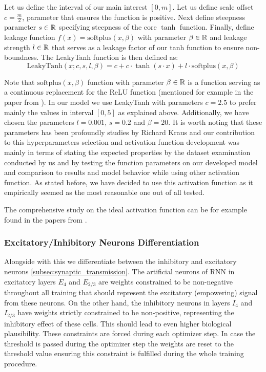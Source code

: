 \begin{defn}[LeakyTanh]
    Let us define the interval of our main interest $[0, m]$. Let us define scale offset $c = \frac{m}{2}$, parameter that ensures the function is positive. Next define steepness parameter $s \in \mathbb{R}$ specifying steepness of the core $\tanh$ function. Finally, define leakage function $f(x) = \text{softplus}(x, \beta)$ with parameter $\beta \in \mathbb{R}$ and leakage strength $l \in \mathbb{R}$ that serves as a leakage factor of our tanh function to ensure non-boundness. The LeakyTanh function is then defined as:
        $$\text{LeakyTanh}(x; c, s, l, \beta) = c + c \cdot \tanh(s \cdot x) + l \cdot \text{softplus}(x, \beta)$$
\end{defn}
\label{def:leakytanh}

Note that $\text{softplus}(x, \beta)$ function with parameter $\beta \in \mathbb{R}$ is a function serving as a continuous replacement for the ReLU function (mentioned for example in the paper from \citet{nwankpa2018activationfunctionscomparisontrends}). In our model we use LeakyTanh with parameters $c=2.5$ to prefer mainly the values in interval $[0, 5]$ as explained above. Additionally, we have chosen the parameters $l=0.001$, $s=0.2$ and $\beta=20$. It is worth noting that these parameters has been profoundly studies by Richard Kraus and our contribution to this hyperparameters selection and activation function development was mainly in terms of stating the expected properties by the dataset examination conducted by us and by testing the function parameters on our developed model and comparison to results and model behavior while using other activation function. As stated before, we have decided to use this activation function as it empirically seemed as the most reasonable one out of all tested. 

The comprehensive study on the ideal activation function can be for example found in the papers from \citet{shiv2022activation, nwankpa2018activationfunctionscomparisontrends}.

\subsubsection{Excitatory/Inhibitory Neurons Differentiation}
\label{subsubsec:exc_inh_differentiation}

Alongside with this we differentiate between the inhibitory and excitatory neurons \ref{subsec:synaptic_transmission}. The artificial neurons of RNN in excitatory layers $E_4$ and $E_{2/3}$ are weights constrained to be non-negative throughout all training that should represent the excitatory (empowering) signal from these neurons. On the other hand, the inhibitory neurons in layers $I_4$ and $I_{2/3}$ have weights strictly constrained to be non-positive, representing the inhibitory effect of these cells. This should lead to even higher biological plausibility. These constraints are forced during each optimizer step. In case the threshold is passed during the optimizer step the weights are reset to the threshold value ensuring this constraint is fulfilled during the whole training procedure.

